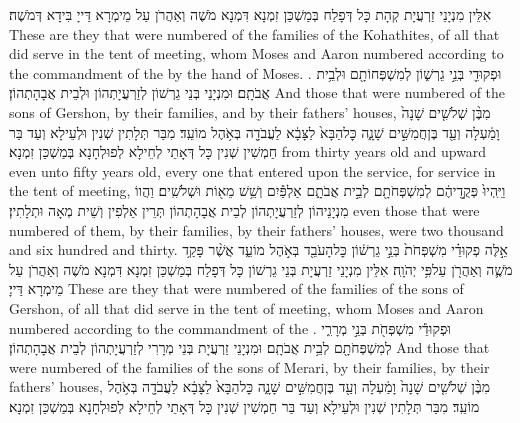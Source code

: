 {אִלֵּין מִנְיָנֵי זַרְעֲיָת קְהָת כָּל דְּפָלַח בְּמַשְׁכַּן זִמְנָא דִּמְנָא מֹשֶׁה וְאַהֲרֹן עַל מֵימְרָא דַּייָ בִּידָא דְּמֹשֶׁה׃}
{These are they that were numbered of the families of the Kohathites, of all that did serve in the tent of meeting, whom Moses and Aaron numbered according to the commandment of the \lord\space by the hand of Moses. .}{}
{וּפְקוּדֵ֖י בְּנֵ֣י גֵרְשׁ֑וֹן לְמִשְׁפְּחוֹתָ֖ם וּלְבֵ֥ית אֲבֹתָֽם׃}
{וּמִנְיָנֵי בְּנֵי גֵרְשׁוֹן לְזַרְעֲיָתְהוֹן וּלְבֵית אֲבָהָתְהוֹן׃}
{And those that were numbered of the sons of Gershon, by their families, and by their fathers’ houses,}{}
{מִבֶּ֨ן שְׁלֹשִׁ֤ים שָׁנָה֙ וָמַ֔עְלָה וְעַ֖ד בֶּן\maqqaf חֲמִשִּׁ֣ים שָׁנָ֑ה כׇּל\maqqaf הַבָּא֙ לַצָּבָ֔א לַעֲבֹדָ֖ה בְּאֹ֥הֶל מוֹעֵֽד׃}
{מִבַּר תְּלָתִין שְׁנִין וּלְעֵילָא וְעַד בַּר חַמְשִׁין שְׁנִין כָּל דְּאָתֵי לְחֵילָא לְפוּלְחָנָא בְּמַשְׁכַּן זִמְנָא׃}
{from thirty years old and upward even unto fifty years old, every one that entered upon the service, for service in the tent of meeting,}{}
{וַיִּֽהְיוּ֙ פְּקֻ֣דֵיהֶ֔ם לְמִשְׁפְּחֹתָ֖ם לְבֵ֣ית אֲבֹתָ֑ם אַלְפַּ֕יִם וְשֵׁ֥שׁ מֵא֖וֹת וּשְׁלֹשִֽׁים׃}
{וַהֲווֹ מִנְיָנֵיהוֹן לְזַרְעֲיָתְהוֹן לְבֵית אֲבָהָתְהוֹן תְּרֵין אַלְפִין וְשֵׁית מְאָה וּתְלָתִין׃}
{even those that were numbered of them, by their families, by their fathers’ houses, were two thousand and six hundred and thirty.}{}
{אֵ֣לֶּה פְקוּדֵ֗י מִשְׁפְּחֹת֙ בְּנֵ֣י גֵרְשׁ֔וֹן כׇּל\maqqaf הָעֹבֵ֖ד בְּאֹ֣הֶל מוֹעֵ֑ד אֲשֶׁ֨ר פָּקַ֥ד מֹשֶׁ֛ה וְאַהֲרֹ֖ן עַל\maqqaf פִּ֥י יְהֹוָֽה׃}
{אִלֵּין מִנְיָנֵי זַרְעֲיָת בְּנֵי גֵרְשׁוֹן כָּל דְּפָלַח בְּמַשְׁכַּן זִמְנָא דִּמְנָא מֹשֶׁה וְאַהֲרֹן עַל מֵימְרָא דַּייָ׃}
{These are they that were numbered of the families of the sons of Gershon, of all that did serve in the tent of meeting, whom Moses and Aaron numbered according to the commandment of the \lord.}{}
{וּפְקוּדֵ֕י מִשְׁפְּחֹ֖ת בְּנֵ֣י מְרָרִ֑י לְמִשְׁפְּחֹתָ֖ם לְבֵ֥ית אֲבֹתָֽם׃}
{וּמִנְיָנֵי זַרְעֲיָת בְּנֵי מְרָרִי לְזַרְעֲיָתְהוֹן לְבֵית אֲבָהָתְהוֹן׃}
{And those that were numbered of the families of the sons of Merari, by their families, by their fathers’ houses,}{}
{מִבֶּ֨ן שְׁלֹשִׁ֤ים שָׁנָה֙ וָמַ֔עְלָה וְעַ֖ד בֶּן\maqqaf חֲמִשִּׁ֣ים שָׁנָ֑ה כׇּל\maqqaf הַבָּא֙ לַצָּבָ֔א לַעֲבֹדָ֖ה בְּאֹ֥הֶל מוֹעֵֽד׃}
{מִבַּר תְּלָתִין שְׁנִין וּלְעֵילָא וְעַד בַּר חַמְשִׁין שְׁנִין כָּל דְּאָתֵי לְחֵילָא לְפוּלְחָנָא בְּמַשְׁכַּן זִמְנָא׃}
